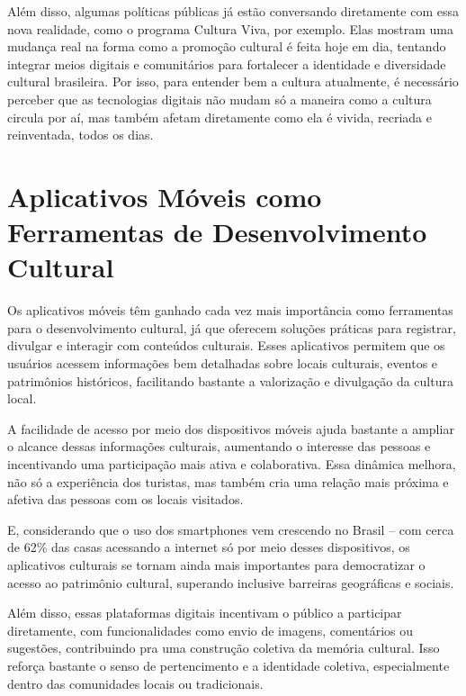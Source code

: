 Além disso, algumas políticas públicas já estão conversando diretamente com essa nova realidade, como o programa Cultura Viva, por exemplo. Elas mostram uma mudança real na forma como a promoção cultural é feita hoje em dia, tentando integrar meios digitais e comunitários para fortalecer a identidade e diversidade cultural brasileira. Por isso, para entender bem a cultura atualmente, é necessário perceber que as tecnologias digitais não mudam só a maneira como a cultura circula por aí, mas também afetam diretamente como ela é vivida, recriada e reinventada, todos os dias. \cite{prolam-cultura-viva-2025}

\section{Aplicativos Móveis como Ferramentas de Desenvolvimento Cultural} \label{sec:fundamentacao:Aplicativos Móveis como Ferramentas de Desenvolvimento Cultural}

Os aplicativos móveis têm ganhado cada vez mais importância como ferramentas para o desenvolvimento cultural, já que oferecem soluções práticas para registrar, divulgar e interagir com conteúdos culturais. Esses aplicativos permitem que os usuários acessem informações bem detalhadas sobre locais culturais, eventos e patrimônios históricos, facilitando bastante a valorização e divulgação da cultura local.\cite{oliveira-cultura-tecnologias-ufse}

A facilidade de acesso por meio dos dispositivos móveis ajuda bastante a ampliar o alcance dessas informações culturais, aumentando o interesse das pessoas e incentivando uma participação mais ativa e colaborativa. Essa dinâmica melhora, não só a experiência dos turistas, mas também cria uma relação mais próxima e afetiva das pessoas com os locais visitados.\cite{soster2021tecnologias}

E, considerando que o uso dos smartphones vem crescendo no Brasil – com cerca de 62\% das casas acessando a internet só por meio desses dispositivos, os aplicativos culturais se tornam ainda mais importantes para democratizar o acesso ao patrimônio cultural, superando inclusive barreiras geográficas e sociais.\cite{mcom-2023-internet}

Além disso, essas plataformas digitais incentivam o público a participar diretamente, com funcionalidades como envio de imagens, comentários ou sugestões, contribuindo pra uma construção coletiva da memória cultural. Isso reforça bastante o senso de pertencimento e a identidade coletiva, especialmente dentro das comunidades locais ou tradicionais.\cite{prolam-cultura-viva-2025}

